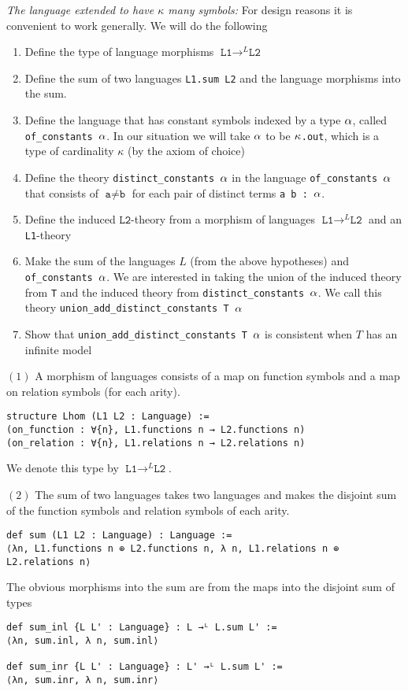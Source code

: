 \textit{The language extended to have $\kappa$ many symbols:}
For design reasons it is convenient to work generally.
We will do the following
\begin{enumerate}
  \item Define the type of language morphisms $\texttt{L1} \to^{L} \texttt{L2}$
  \item Define the sum of two languages \texttt{L1.sum L2}
        and the language morphisms into the sum.
  \item Define the language that has constant symbols indexed by a type $\alpha$,
        called \texttt{of\_constants $\alpha$}.
        In our situation we will take $\alpha$ to be \texttt{$\kappa$.out},
        which is a type of cardinality $\kappa$ (by the axiom of choice)
  \item Define the theory \texttt{distinct\_constants $\alpha$}
        in the language \texttt{of\_constants $\alpha$}
        that consists of $\texttt{a} \ne \texttt{b}$
        for each pair of distinct terms \texttt{a b : $\alpha$}.
  \item Define the induced $\texttt{L2}$-theory
        from a morphism of languages $\texttt{L1} \to^{L} \texttt{L2}$ and
        an \texttt{L1}-theory
  \item Make the sum of the languages $L$ (from the above hypotheses)
        and \texttt{of\_constants $\alpha$}.
        We are interested in taking the union of the induced theory from \texttt{T}
        and the induced theory from
        \texttt{distinct\_constants $\alpha$}.
        We call this theory \texttt{union\_add\_distinct\_constants T $\alpha$}
  \item Show that \texttt{union\_add\_distinct\_constants T $\alpha$} is consistent
        when $T$ has an infinite model
\end{enumerate}

$(1)$ A morphism of languages consists of a map on function symbols
and a map on relation symbols (for each arity).
\begin{lstlisting}
structure Lhom (L1 L2 : Language) :=
(on_function : ∀{n}, L1.functions n → L2.functions n)
(on_relation : ∀{n}, L1.relations n → L2.relations n) \end{lstlisting}
We denote this type by $\texttt{L1} \to^{L} \texttt{L2}$.

$(2)$ The sum of two languages takes two languages and makes the
disjoint sum of the function symbols and relation symbols of
each arity.
\begin{lstlisting}
def sum (L1 L2 : Language) : Language :=
⟨λn, L1.functions n ⊕ L2.functions n, λ n, L1.relations n ⊕ L2.relations n⟩ \end{lstlisting}
The obvious morphisms into the sum are from the maps into the disjoint
sum of types
\begin{lstlisting}
def sum_inl {L L' : Language} : L →ᴸ L.sum L' :=
⟨λn, sum.inl, λ n, sum.inl⟩

def sum_inr {L L' : Language} : L' →ᴸ L.sum L' :=
⟨λn, sum.inr, λ n, sum.inr⟩ \end{lstlisting}


